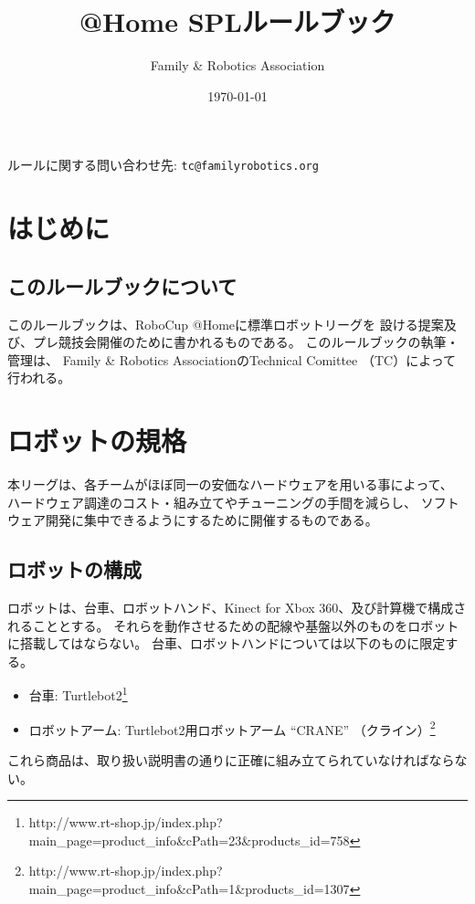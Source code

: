 \documentclass[a4j]{jarticle}
\title{@Home SPLルールブック}
\author{Family \& Robotics Association}
\date{\today}
\begin{document}
%
%
\maketitle

\begin{center}
ルールに関する問い合わせ先: {\tt tc@familyrobotics.org}
\end{center}

\vspace{3em}
%
%
\tableofcontents
\newpage

\section{はじめに}

\subsection{このルールブックについて}

このルールブックは、RoboCup @Homeに標準ロボットリーグを
設ける提案及び、プレ競技会開催のために書かれるものである。
このルールブックの執筆・管理は、
Family \& Robotics AssociationのTechnical Comittee
（TC）によって行われる。

\section{ロボットの規格}

本リーグは、各チームがほぼ同一の安価なハードウェアを用いる事によって、
ハードウェア調達のコスト・組み立てやチューニングの手間を減らし、
ソフトウェア開発に集中できるようにするために開催するものである。

\subsection{ロボットの構成}

ロボットは、台車、ロボットハンド、Kinect for Xbox 360、及び計算機で構成されることとする。
それらを動作させるための配線や基盤以外のものをロボットに搭載してはならない。
台車、ロボットハンドについては以下のものに限定する。
\begin{itemize}
	\item 台車: Turtlebot2\footnote{http://www.rt-shop.jp/index.php?main\_page=product\_info\&cPath=23\&products\_id=758}
	\item ロボットアーム: Turtlebot2用ロボットアーム ``CRANE'' （クライン）\footnote{http://www.rt-shop.jp/index.php?main\_page=product\_info\&cPath=1\&products\_id=1307}
\end{itemize}
これら商品は、取り扱い説明書の通りに正確に組み立てられていなければならない。
\end{document}
